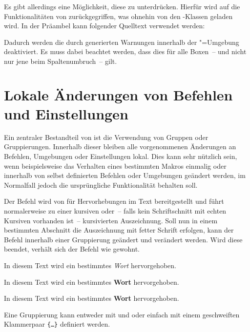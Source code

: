Es gibt allerdings eine Möglichkeit, diese zu unterdrücken. Hierfür wird auf 
die Funktionalitäten von  zurückgegriffen, was ohnehin von 
den \TUDScript-Klassen geladen wird. In der Präambel kann folgender Quelltext 
verwendet werden:
%
\begin{quoting}
\begin{Code}
\makeatletter
{}
\makeatother
\end{Code}
\end{quoting}
%
Dadurch werden die durch  generierten Warnungen innerhalb der 
"=Umgebung deaktiviert. Es muss dabei beachtet werden, 
dass dies für alle Boxen~-- und nicht nur jene beim Spaltenumbruch~-- gilt.



\section{Lokale Änderungen von Befehlen und Einstellungen}
%
Ein zentraler Bestandteil von  ist die Verwendung von Gruppen 
oder Gruppierungen. Innerhalb dieser bleiben alle vorgenommenen Änderungen an 
Befehlen, Umgebungen oder Einstellungen lokal. Dies kann sehr nützlich sein, 
wenn beispielsweise das Verhalten eines bestimmten Makros einmalig oder 
innerhalb von selbst definierten Befehlen oder Umgebungen geändert werden, im 
Normalfall jedoch die ursprüngliche Funktionalität behalten soll.
\begin{Example}
Der Befehl  wird von  für Hervorhebungen im Text 
bereitgestellt und führt normalerweise zu einer kursiven oder~-- falls kein 
Schriftschnitt mit echten Kursiven vorhanden ist~-- kursivierten Auszeichnung. 
Soll nun in einem bestimmten Abschnitt die Auszeichnung mit fetter Schrift 
erfolgen, kann der Befehl  innerhalb einer Gruppierung geändert 
und verändert werden. Wird diese beendet, verhält sich der Befehl wie gewohnt.
\begin{Code}
In diesem Text wird ein bestimmtes \emph{Wort} hervorgehoben.

\begingroup
\renewcommand*\emph[1]{\textbf{#1}}%
In diesem Text wird ein bestimmtes \emph{Wort} hervorgehoben.
\endgroup

In diesem Text wird ein bestimmtes \emph{Wort} hervorgehoben.
\end{Code}
\end{Example}
Eine Gruppierung kann entweder mit  und  
oder einfach mit einem geschweiften Klammerpaar \texttt{\{\dots\}} definiert 
werden.



